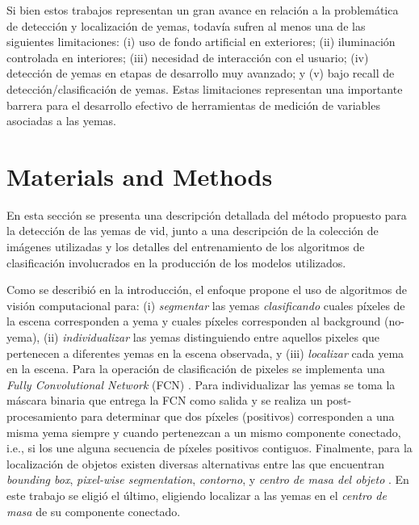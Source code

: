 \documentclass[a4paper,authoryear,review]{elsarticle}
\begin{document}
Si bien estos trabajos representan un gran avance en relación a la problemática de detección y localización de yemas, todavía sufren al menos una de las siguientes limitaciones: (i) uso de fondo artificial en exteriores; (ii) iluminación controlada en interiores; (iii) necesidad de interacción con el usuario; (iv) detección de yemas en etapas de desarrollo muy avanzado; y (v) bajo recall de detección/clasificación de yemas. Estas limitaciones representan una importante barrera para el desarrollo efectivo de herramientas de medición de variables asociadas a las yemas. 


\section{Materials and Methods}
\label{sec:matmet}

En esta sección se presenta una descripción detallada del método propuesto para la  detección de las yemas de vid, junto a una descripción de la colección de imágenes utilizadas y los detalles del entrenamiento de los algoritmos de clasificación involucrados en la producción de los modelos utilizados.

Como se describió en la introducción, el enfoque propone el uso de algoritmos de visión computacional para: (i) \emph{segmentar} las yemas \emph{clasificando} cuales píxeles de la escena corresponden a yema y cuales píxeles corresponden al background (no-yema), (ii) \emph{individualizar} las yemas distinguiendo entre aquellos pixeles que pertenecen a diferentes yemas en la escena observada, y (iii) \emph{localizar} cada yema en la escena. Para la operación de clasificación de pixeles se implementa una \emph{Fully Convolutional Network} (FCN) \citep{long2015fully, shelhamer2017fully}. Para individualizar las yemas se toma la máscara binaria que entrega la FCN como salida y se realiza un post-procesamiento para determinar que dos píxeles (positivos) corresponden a una misma yema siempre y cuando pertenezcan a un mismo componente conectado, i.e., si los une alguna secuencia de píxeles positivos contiguos. Finalmente, para la localización de objetos existen diversas alternativas entre las que encuentran \emph{bounding box}, \emph{pixel-wise segmentation}, \emph{contorno}, y \emph{centro de masa del objeto} \citep{lampert2008beyond}. En este trabajo se eligió el último, eligiendo localizar a las yemas en el \emph{centro de masa} de su componente conectado. 
\end{document}
